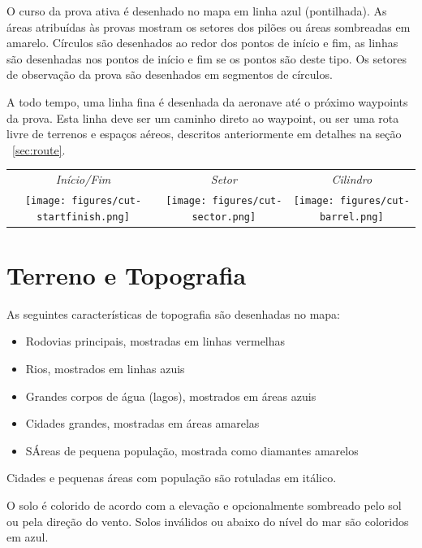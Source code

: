 O curso da prova ativa é desenhado no mapa em linha azul (pontilhada).  As áreas atribuídas às provas mostram os setores dos pilões ou áreas sombreadas em amarelo.  Círculos são desenhados ao redor dos pontos de início e fim, as linhas são desenhadas nos pontos de início e fim se os pontos são deste tipo.  Os setores de observação da prova são desenhados em segmentos de círculos.

A todo tempo, uma linha fina é desenhada da aeronave até o próximo waypoints da prova.  Esta linha deve ser um caminho direto ao waypoint, ou ser uma rota livre de terrenos e espaços aéreos, descritos anteriormente em detalhes na seção
~\ref{sec:route}.

\begin{center}
\begin{tabular}{c c c}
{\it Início/Fim} & {\it Setor} & {\it Cilindro} \\
\texttt{[image: figures/cut-startfinish.png]} &
\texttt{[image: figures/cut-sector.png]} &
\texttt{[image: figures/cut-barrel.png]} \\
\end{tabular}
\end{center}


\section{Terreno e Topografia}\label{sec:terrain_topo}

As seguintes características de topografia são desenhadas no mapa:
\begin{itemize}
\item Rodovias principais, mostradas em linhas vermelhas
\item Rios, mostrados em linhas azuis
\item Grandes corpos de água (lagos), mostrados em áreas azuis
\item Cidades grandes, mostradas em áreas amarelas
\item SÁreas de pequena população, mostrada como diamantes amarelos 
\end{itemize}
Cidades e pequenas áreas com população são rotuladas em itálico.

O solo é colorido de acordo com a elevação e opcionalmente sombreado pelo sol ou pela direção do vento.  Solos inválidos ou abaixo do nível do mar são coloridos em azul.




